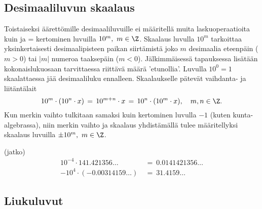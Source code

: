 \subsection{Desimaaliluvun skaalaus}

Toistaiseksi äärettömille desimaaliluvuille ei määritellä muita laskuoperaatioita kuin
 ja  = kertominen luvuilla $10^m,\ m\in\Z$. Skaalaus
luvulla $10^m$ tarkoittaa yksinkertaisesti desimaalipisteen paikan siirtämistä joko $m$
desimaalia eteenpäin ($m>0$) tai $|m|$ numeroa taaksepäin ($m<0$). Jälkimmäisessä tapauksessa
lisätään kokonaislukuosaan tarvittaessa riittävä määrä 'etunollia'. Luvulla $10^0=1$ 
skaalattaessa jää desimaaliluku ennalleen. Skaalaukselle pätevät vaihdanta- ja
liitäntälait 
\[
10^m \cdot (10^n \cdot x) \,=\, 10^{m+n} \cdot x 
                          \,=\, 10^n \cdot (10^m \cdot x), \quad m,n\in\Z.
\]
Kun merkin vaihto tulkitaan samaksi kuin kertominen luvulla $-1$ (kuten kunta-algebrassa),
niin merkin vaihto ja skaalaus yhdistämällä tulee määritellyksi skaalaus luvuilla
$\pm 10^m,\ m\in\Z$. 
\jatko\jatko \begin{Exa} (jatko)
\begin{align*}
 10^{-4} \cdot 141.421356 \ldots\  &=\ 0.0141421356 \ldots \\
 -10^4 \cdot (-0.00314159 \ldots)\ &=\ 31.4159 \ldots
\end{align*}
\end{Exa} \seur

\subsection{Liukuluvut}
%

